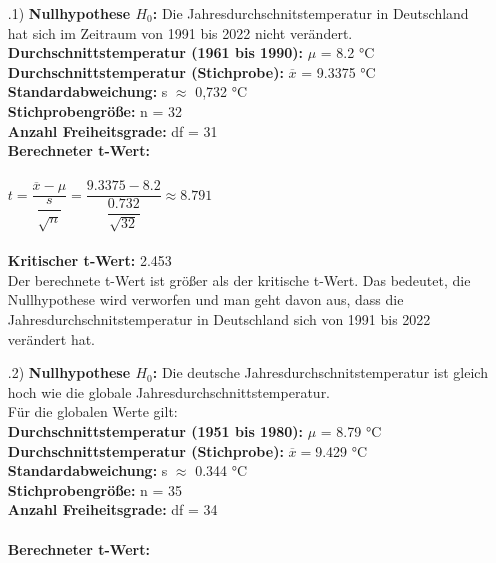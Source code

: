\documentclass[12pt]{scrartcl}
\begin{document}
\exercise{}
\begin{itemize}
    \item[\theenumi.1)] \textbf{Nullhypothese $H_0$:} Die Jahresdurchschnitstemperatur in Deutschland hat sich 
                                                      im Zeitraum von 1991 bis 2022 nicht verändert.\\
                        \textbf{Durchschnittstemperatur (1961 bis 1990):} $\mu$ = 8.2 °C\\
                        \textbf{Durchschnittstemperatur (Stichprobe):} $\overline{x}$ = 9.3375 °C\\
                        \textbf{Standardabweichung:} s $\approx$ 0,732 °C\\
                        \textbf{Stichprobengröße:} n = 32\\
                        \textbf{Anzahl Freiheitsgrade:} df = 31\\
                        \textbf{Berechneter t-Wert:} \\\\
                        $t = \dfrac{\overline{x}-\mu}{\dfrac{s}{\sqrt{n}}} = \dfrac{9.3375-8.2}{\dfrac{0.732}{\sqrt{32}}} \approx 8.791$\\\\
                        \textbf{Kritischer t-Wert:} 2.453\\
                        Der berechnete t-Wert ist größer als der kritische t-Wert. Das bedeutet, die Nullhypothese wird verworfen und man geht davon aus,
                        dass die Jahresdurchschnitstemperatur in Deutschland sich von 1991 bis 2022 verändert hat.
                        
	\item[\theenumi.2)] \textbf{Nullhypothese $H_0$:} Die deutsche Jahresdurchschnitstemperatur ist gleich hoch wie die globale Jahresdurchschnittstemperatur.\\
	Für die globalen Werte gilt:\\
	\textbf{Durchschnittstemperatur (1951 bis 1980):} $\mu$ = 8.79 °C\\
						\textbf{Durchschnittstemperatur (Stichprobe):} $\overline{x} = $9.429 °C\\
                        \textbf{Standardabweichung:} s $\approx$ 0.344 °C \\
                        \textbf{Stichprobengröße:} n = 35\\
                        \textbf{Anzahl Freiheitsgrade:} df = 34 \\
                        \\
\textbf{Berechneter t-Wert:}


\end{itemize}
\end{document}
